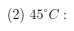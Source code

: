 \documentclass[UTF8]{ctexart}
\begin{document}
\begin{CJK*}{UTF8}{song}
  %
\newpage

(2) $45^{\circ}C$ : \\


\end{CJK*}
\end{document}
